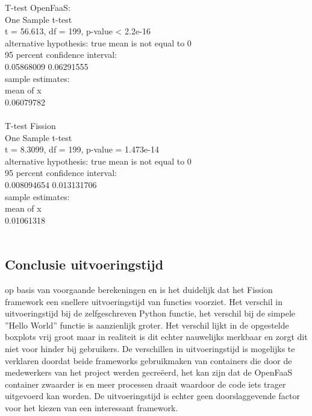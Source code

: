 T-test OpenFaaS:\\
One Sample t-test\\
    t = 56.613, df = 199, p-value < 2.2e-16\\
alternative hypothesis: true mean is not equal to 0\\
95 percent confidence interval:\\
 0.05868009 0.06291555\\
sample estimates:\\
 mean of x\\
0.06079782 \\\\

T-test Fission\\
One Sample t-test\\
    t = 8.3099, df = 199, p-value = 1.473e-14\\
alternative hypothesis: true mean is not equal to 0\\
95 percent confidence interval:\\
 0.008094654 0.013131706\\
sample estimates:\\
 mean of x \\
0.01061318\\\\

\subsection{Conclusie uitvoeringstijd}
op basis van voorgaande berekeningen en is het duidelijk dat het Fission framework een snellere uitvoeringstijd van functies voorziet. Het verschil in uitvoeringstijd bij de zelfgeschreven Python functie, het verschil bij de simpele ''Hello World'' functie is aanzienlijk groter. Het verschil lijkt in de opgestelde boxplots vrij groot maar in realiteit is dit echter nauwelijks merkbaar en zorgt dit niet voor hinder bij gebruikers. De verschillen in uitvoeringstijd is mogelijks te verklaren doordat beide frameworks gebruikmaken van containers die door de medewerkers van het project werden gecreëerd, het kan zijn dat de OpenFaaS container zwaarder is en meer processen draait waardoor de code iets trager uitgevoerd kan worden. De uitvoeringstijd is echter geen doorslaggevende factor voor het kiezen van een interessant framework.